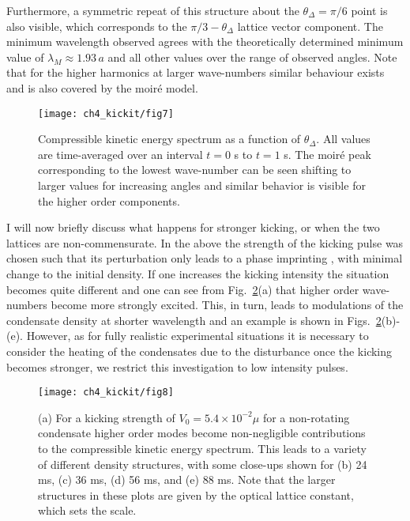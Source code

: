     Furthermore, a symmetric repeat of this structure about the $\theta_\Delta=\pi/6$ point is also visible, which corresponds to the $\pi/3 - \theta_\Delta$ lattice vector component. The minimum wavelength observed agrees with the theoretically determined minimum value of $\lambda_M\approx 1.93\,a$ and all other values over the range of observed angles. Note that for the higher harmonics at larger wave-numbers similar behaviour exists and is also covered by the moir\'e model.
	\begin{figure}[tb]
		\texttt{[image: ch4\_kickit/fig7]}
		\caption{Compressible kinetic energy spectrum as a function of $\theta_\Delta$. All values are time-averaged over an interval $t=0$ s to $t=1$ s. The moir\'e peak corresponding to the lowest wave-number can be seen shifting to larger values for increasing angles and similar behavior is visible for the higher order components.}
		\label{fig:dtheta_kspec}
	\end{figure}

    I will now briefly discuss what happens for stronger kicking, or when the two lattices are non-commensurate. In the above the strength of the kicking pulse was chosen such that its perturbation only leads to a phase imprinting \cite{Vtx:Dobrek_pra_1999,BEC:Denschlag_science_2000}, with minimal change to the initial density. If one increases the kicking intensity the situation becomes quite different and one can see from Fig.~\ref{fig:kickp20k}(a) that higher order wave-numbers become more strongly excited. This, in turn, leads to modulations of the condensate density at shorter wavelength and an example is shown in Figs.~\ref{fig:kickp20k}(b)-(e). However, as for fully realistic experimental situations it is necessary to consider the heating of the condensates due to the disturbance once the kicking becomes stronger, we restrict this investigation to low intensity pulses.

\begin{figure}[tb]
	\texttt{[image: ch4\_kickit/fig8]}
	\caption{(a) For a kicking strength of $V_0 = 5.4\times10^{-2}\mu$ for a non-rotating condensate higher order modes become non-negligible contributions to the compressible kinetic energy spectrum. This leads to a variety of different density structures, with some close-ups shown for (b) 24 ms, (c) 36 ms, (d) 56 ms, and (e) 88 ms. Note that the larger structures in these plots are given by the optical lattice constant, which sets the scale.}
	\label{fig:kickp20k}
\end{figure}

